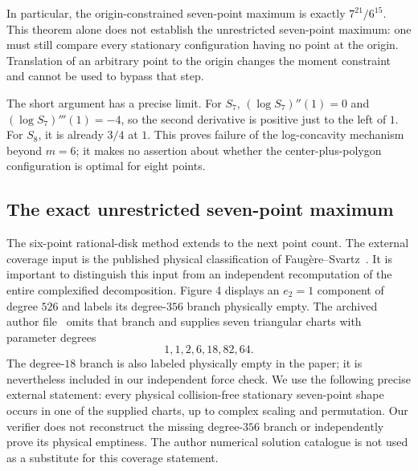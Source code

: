 \documentclass[11pt]{article}
\theoremstyle{remark}
\numberwithin{equation}{section}
\begin{document}
In particular, the origin-constrained seven-point maximum is exactly
$7^{21}/6^{15}$. This theorem alone does not establish the unrestricted
seven-point maximum: one must still compare every stationary configuration
having no point at the origin. Translation of an arbitrary point to the
origin changes the moment constraint and cannot be used to bypass that step.

The short argument has a precise limit. For $S_7$,
$(\log S_7)''(1)=0$ and $(\log S_7)'''(1)=-4$, so the second derivative is
positive just to the left of $1$. For $S_8$, it is already $3/4$ at $1$.
This proves failure of the log-concavity mechanism beyond $m=6$; it makes
no assertion about whether the center-plus-polygon configuration is
optimal for eight points.

\subsection{The exact unrestricted seven-point maximum}
\label{sec:seven-global-exact}

The six-point rational-disk method extends to the next point count.
The external coverage input is the published physical classification
of Faug\`ere--Svartz~\cite[Sections 5.3--5.7 and Section 7,
Figure 4]{FS}. It is important to distinguish this input from an
independent recomputation of the entire complexified decomposition.
Figure 4 displays an $e_2=1$ component of degree $526$ and labels
its degree-$356$ branch physically empty. The archived author
file~\cite{FSdataSeven} omits that branch and supplies seven
triangular charts with parameter degrees
\[
                         1,1,2,6,18,82,64.
\]
The degree-$18$ branch is also labeled physically empty in the
paper; it is nevertheless included in our independent force check.
We use the following precise external statement: every physical
collision-free stationary seven-point shape occurs in one of the
supplied charts, up to complex scaling and permutation. Our
verifier does not reconstruct the missing degree-$356$ branch or
independently prove its physical emptiness. The author numerical
solution catalogue is not used as a substitute for this coverage
statement.
\end{document}
